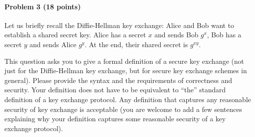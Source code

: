 \paragraph{Problem 3 (18 points)} 

Let us briefly recall the Diffie-Hellman key exchange: Alice and Bob want to establish a shared secret key. Alice has a secret $x$ and sends Bob $g^x$, Bob has a secret $y$ and sends Alice $g^y$. At the end, their shared secret is $g^{xy}$. 

This question asks you to give a formal definition of a secure key exchange (not just for the Diffie-Hellman key exchange, but for secure key exchange schemes in general). 
Please provide the syntax and the requirements of correctness and security. 
Your definition does not have to be equivalent to ``the'' standard definition of a key exchange protocol. Any definition that captures any reasonable security of key exchange is acceptable (you are welcome to add a few sentences explaining why your definition captures some reasonable security of a key exchange protocol). 

